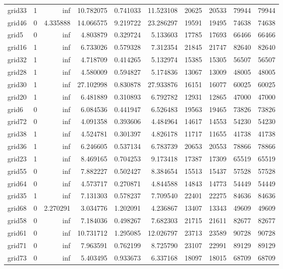 \begin{longtable}{|l|r|r|r|r|r|r|r|r|r|}
grid33 & 1 & inf & 10.782075 & 0.741033 & 11.523108 & 20625 & 20533 & 79944 & 79944 \\
grid46 & 0 & 4.335888 & 14.066575 & 9.219722 & 23.286297 & 19591 & 19495 & 74638 & 74638 \\
grid5 & 0 & inf & 4.803879 & 0.329724 & 5.133603 & 17785 & 17693 & 66466 & 66466 \\
grid16 & 1 & inf & 6.733026 & 0.579328 & 7.312354 & 21845 & 21747 & 82640 & 82640 \\
grid32 & 1 & inf & 4.718709 & 0.414265 & 5.132974 & 15385 & 15305 & 56507 & 56507 \\
grid28 & 1 & inf & 4.580009 & 0.594827 & 5.174836 & 13067 & 13009 & 48005 & 48005 \\
grid30 & 1 & inf & 27.102998 & 0.830878 & 27.933876 & 16151 & 16077 & 60025 & 60025 \\
grid20 & 1 & inf & 6.481889 & 0.310893 & 6.792782 & 12931 & 12865 & 47000 & 47000 \\
grid6 & 0 & inf & 6.084536 & 0.441947 & 6.526483 & 19563 & 19465 & 73826 & 73826 \\
grid72 & 0 & inf & 4.091358 & 0.393606 & 4.484964 & 14617 & 14553 & 54230 & 54230 \\
grid38 & 1 & inf & 4.524781 & 0.301397 & 4.826178 & 11717 & 11655 & 41738 & 41738 \\
grid36 & 1 & inf & 6.246605 & 0.537134 & 6.783739 & 20653 & 20553 & 78866 & 78866 \\
grid23 & 1 & inf & 8.469165 & 0.704253 & 9.173418 & 17387 & 17309 & 65519 & 65519 \\
grid55 & 0 & inf & 7.882227 & 0.502427 & 8.384654 & 15513 & 15437 & 57528 & 57528 \\
grid64 & 0 & inf & 4.573717 & 0.270871 & 4.844588 & 14843 & 14773 & 54449 & 54449 \\
grid35 & 1 & inf & 7.131303 & 0.578237 & 7.709540 & 22401 & 22275 & 84636 & 84636 \\
grid68 & 0 & 2.270291 & 3.034776 & 1.202091 & 4.236867 & 13407 & 13343 & 49609 & 49609 \\
grid58 & 0 & inf & 7.184036 & 0.498267 & 7.682303 & 21715 & 21611 & 82677 & 82677 \\
grid61 & 0 & inf & 10.731712 & 1.295085 & 12.026797 & 23713 & 23589 & 90728 & 90728 \\
grid71 & 0 & inf & 7.963591 & 0.762199 & 8.725790 & 23107 & 22991 & 89129 & 89129 \\
grid73 & 0 & inf & 5.403495 & 0.933673 & 6.337168 & 18097 & 18015 & 68709 & 68709 \\

\end{longtable}
